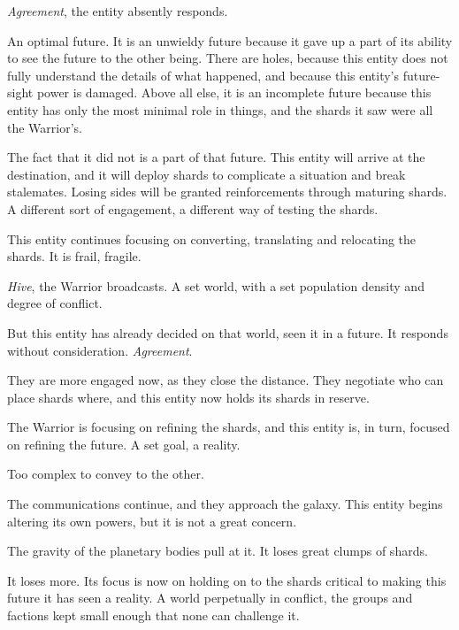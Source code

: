 \emph{Agreement}, the entity absently responds.



An optimal future.  It is an unwieldy future because it gave up a part of its ability to see the future to the other being.  There are holes, because this entity does not fully understand the details of what happened, and because this entity's future-sight power is damaged.  Above all else, it is an incomplete future because this entity has only the most minimal role in things, and the shards it saw were all the Warrior's.



The fact that it did not is a part of that future.  This entity will arrive at the destination, and it will deploy shards to complicate a situation and break stalemates.  Losing sides will be granted reinforcements through maturing shards.  A different sort of engagement, a different way of testing the shards.



This entity continues focusing on converting, translating and relocating the shards.  It is frail, fragile.



\emph{Hive}, the Warrior broadcasts.  A set world, with a set population density and degree of conflict.



But this entity has already decided on that world, seen it in a future.  It responds without consideration.  \emph{Agreement}.



They are more engaged now, as they close the distance.  They negotiate who can place shards where, and this entity now holds its shards in reserve.



The Warrior is focusing on refining the shards, and this entity is, in turn, focused on refining the future.  A set goal, a reality.



Too complex to convey to the other.



The communications continue, and they approach the galaxy.  This entity begins altering its own powers, but it is not a great concern.



The gravity of the planetary bodies pull at it.  It loses great clumps of shards.



It loses more.  Its focus is now on holding on to the shards critical to making this future it has seen a reality.  A world perpetually in conflict, the groups and factions kept small enough that none can challenge it.




